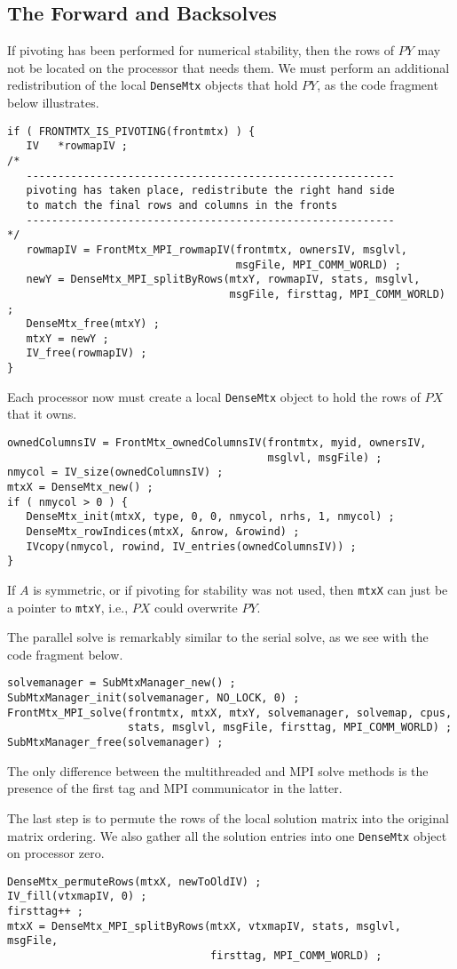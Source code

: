 \subsection{The Forward and Backsolves}
\label{subsection:MPI:solve}
\par
If pivoting has been performed for numerical stability, then the
rows of $PY$ may not be located on the processor that needs them.
We must perform an additional redistribution of the local
{\tt DenseMtx} objects that hold $PY$, as the code fragment below
illustrates.
\begin{verbatim}
if ( FRONTMTX_IS_PIVOTING(frontmtx) ) {
   IV   *rowmapIV ;
/*
   ----------------------------------------------------------
   pivoting has taken place, redistribute the right hand side
   to match the final rows and columns in the fronts
   ----------------------------------------------------------
*/
   rowmapIV = FrontMtx_MPI_rowmapIV(frontmtx, ownersIV, msglvl,
                                    msgFile, MPI_COMM_WORLD) ;
   newY = DenseMtx_MPI_splitByRows(mtxY, rowmapIV, stats, msglvl,
                                   msgFile, firsttag, MPI_COMM_WORLD) ;
   DenseMtx_free(mtxY) ;
   mtxY = newY ;
   IV_free(rowmapIV) ;
}
\end{verbatim}
\par
Each processor now must create a local {\tt DenseMtx} object 
to hold the rows of $PX$ that it owns.
\begin{verbatim}
ownedColumnsIV = FrontMtx_ownedColumnsIV(frontmtx, myid, ownersIV,
                                         msglvl, msgFile) ;
nmycol = IV_size(ownedColumnsIV) ;
mtxX = DenseMtx_new() ;
if ( nmycol > 0 ) {
   DenseMtx_init(mtxX, type, 0, 0, nmycol, nrhs, 1, nmycol) ;
   DenseMtx_rowIndices(mtxX, &nrow, &rowind) ;
   IVcopy(nmycol, rowind, IV_entries(ownedColumnsIV)) ;
}
\end{verbatim}
If $A$ is symmetric, or if pivoting for stability was not used,
then {\tt mtxX} can just be a pointer to {\tt mtxY}, i.e.,
$PX$ could overwrite $PY$.
\par
The parallel solve is remarkably similar to the serial solve,
as we see with the code fragment below.
\begin{verbatim}
solvemanager = SubMtxManager_new() ;
SubMtxManager_init(solvemanager, NO_LOCK, 0) ;
FrontMtx_MPI_solve(frontmtx, mtxX, mtxY, solvemanager, solvemap, cpus,
                   stats, msglvl, msgFile, firsttag, MPI_COMM_WORLD) ;
SubMtxManager_free(solvemanager) ;
\end{verbatim}
The only difference between the multithreaded and MPI solve
methods is the presence of the first tag and MPI communicator
in the latter.
\par
The last step is to permute the rows of the local solution matrix
into the original matrix ordering.
We also gather all the solution entries into one {\tt DenseMtx}
object on processor zero.
\begin{verbatim}
DenseMtx_permuteRows(mtxX, newToOldIV) ;
IV_fill(vtxmapIV, 0) ;
firsttag++ ;
mtxX = DenseMtx_MPI_splitByRows(mtxX, vtxmapIV, stats, msglvl, msgFile,
                                firsttag, MPI_COMM_WORLD) ;
\end{verbatim}
\par
